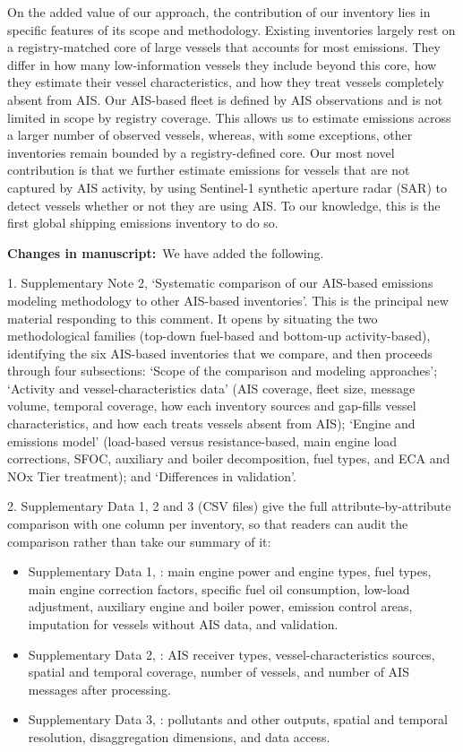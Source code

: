 \documentclass[11pt]{article}
\newcommand{\changes}{\par\medskip\noindent%
  \textbf{\textcolor{changegreen}{Changes in manuscript:}}\ }
\begin{document}
On the added value of our approach, the contribution of our inventory lies in specific features of its scope and methodology. Existing inventories largely rest on a registry-matched core of large vessels that accounts for most emissions. They differ in how many low-information vessels they include beyond this core, how they estimate their vessel characteristics, and how they treat vessels completely absent from AIS. Our AIS-based fleet is defined by AIS observations and is not limited in scope by registry coverage. This allows us to estimate emissions across a larger number of observed vessels, whereas, with some exceptions, other inventories remain bounded by a registry-defined core. Our most novel contribution is that we further estimate emissions for vessels that are not captured by AIS activity, by using Sentinel-1 synthetic aperture radar (SAR) to detect vessels whether or not they are using AIS. To our knowledge, this is the first global shipping emissions inventory to do so.

\changes We have added the following.

1. Supplementary Note 2, `Systematic comparison of our AIS-based emissions modeling methodology to other AIS-based inventories'. This is the principal new material responding to this comment. It opens by situating the two methodological families (top-down fuel-based and bottom-up activity-based), identifying the six AIS-based inventories that we compare, and then proceeds through four subsections: `Scope of the comparison and modeling approaches'; `Activity and vessel-characteristics data' (AIS coverage, fleet size, message volume, temporal coverage, how each inventory sources and gap-fills vessel characteristics, and how each treats vessels absent from AIS); `Engine and emissions model' (load-based versus resistance-based, main engine load corrections, SFOC, auxiliary and boiler decomposition, fuel types, and ECA and NOx Tier treatment); and `Differences in validation'.

2. Supplementary Data 1, 2 and 3 (CSV files) give the full attribute-by-attribute comparison with one column per inventory, so that readers can audit the comparison rather than take our summary of it:

\begin{itemize}
\item Supplementary Data 1, : main engine power and engine types, fuel types, main engine correction factors, specific fuel oil consumption, low-load adjustment, auxiliary engine and boiler power, emission control areas, imputation for vessels without AIS data, and validation.
\item Supplementary Data 2, : AIS receiver types, vessel-characteristics sources, spatial and temporal coverage, number of vessels, and number of AIS messages after processing.
\item Supplementary Data 3, : pollutants and other outputs, spatial and temporal resolution, disaggregation dimensions, and data access.
\end{itemize}
\end{document}

